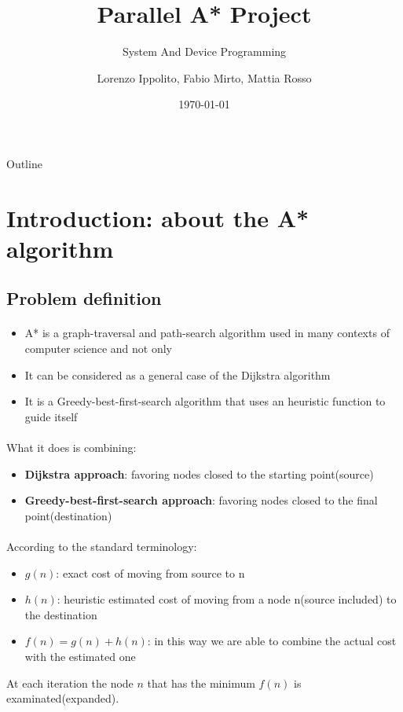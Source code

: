 \documentclass[12pt]{beamer}
\title{Parallel A* Project}
\subtitle{System And Device Programming}
\author{Lorenzo Ippolito, Fabio Mirto, Mattia Rosso}
\institute{Politecnico di Torino}
\date{\today}
\begin{document}
	\begin{frame}
		\titlepage
	\end{frame}
	\begin{frame}[allowframebreaks]{Outline}
		\tableofcontents
	\end{frame}
	\section{Introduction: about the A* algorithm}
	\subsection{Problem definition}
	\begin{frame}{\secname}
		\framesubtitle{\subsecname}
		\begin{itemize}
			\item A* is a graph-traversal and path-search algorithm used in many contexts of computer science and 
			      not only
			\item It can be considered as a general case of the Dijkstra algorithm
			\item It is a Greedy-best-first-search algorithm that uses an heuristic function to guide
				  itself
		\end{itemize}
	\end{frame}
	\begin{frame}{\secname}
		\framesubtitle{\subsecname}
		What it does is combining:
		\begin{itemize}
			\item \textbf{Dijkstra approach}: favoring nodes closed to the starting point(source)
			\item \textbf{Greedy-best-first-search approach}: favoring nodes closed to the final point(destination)
		\end{itemize}
	\end{frame}
	\begin{frame}{\secname}
		\framesubtitle{\subsecname}
		According to the standard terminology:
		\begin{itemize}
			\item $g(n)$: exact cost of moving from source to n
			\item $h(n)$: heuristic estimated cost of moving from a node n(source included) to the destination
			\item $f(n) = g(n) + h(n)$: in this way we are able to combine the actual cost with the estimated one
		\end{itemize}
		At each iteration the node $n$ that has the minimum $f(n)$ is examinated(expanded).
	\end{frame}
\end{document}
